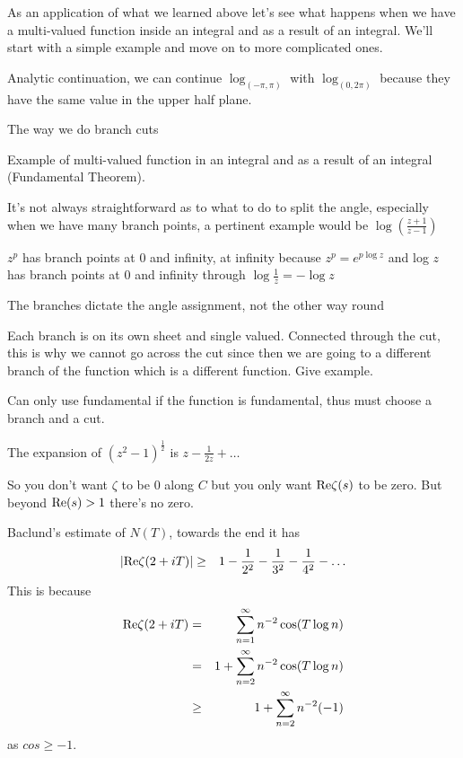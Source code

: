 \documentclass[aps,preprint,preprintnumbers,nofootinbib,showpacs,prd]{revtex4-1}
\newcommand{\nbea}{\begin{eqnarray*}}
\newcommand{\neea}{\end{eqnarray*}}
\newcommand{\re}{{\rm Re}}
\begin{document}
 


As an application of what we learned above let's see what happens when we have a multi-valued function inside an integral and as a result of an integral. We'll start with a simple example and move on to more complicated ones.





Analytic continuation, we can continue $\log_{(-\pi,\pi)}$ with $\log_{(0,2\pi)}$ because they have the same value in the upper half plane.






The way we do branch cuts



Example of multi-valued function in an integral and as a result of an integral (Fundamental Theorem).

It's not always straightforward as to what to do to split the angle, especially when we have many branch points, a pertinent example would be $\log\left ( \tfrac{z+1}{z-1}\right )$













$z^p$ has branch points at 0 and infinity, at infinity because $z^p = e^{p \log z}$ and log $z$ has branch points at 0 and infinity through $\log \tfrac{1}{z} = -\log z$



The branches dictate the angle assignment, not the other way round

Each branch is on its own sheet and single valued. Connected through the cut, this is why we cannot go across the cut since then we are going to a different branch of the function which is a different function. Give example.

Can only use fundamental if the function is fundamental, thus must choose a branch and a cut.

The expansion of $(z^2 - 1)^{\tfrac{1}{2}}$ is $z - \frac{1}{2z} + \dots$










So you don't want $\zeta$ to be 0 along $C$ but you only want $\re \zeta(s)$ to be zero. But beyond $\re(s) > 1$ there's no zero.




Baclund's estimate of $N(T)$, towards the end it has
%
\nbea
\left | \re\zeta(2 + iT)\right | & \ge & 1 - \frac{1}{2^2} - \frac{1}{3^2}- \frac{1}{4^2} - \dots
\neea
%
This is because
%
\nbea
\re\zeta(2 + iT) & = & \sum_{n=1}^\infty n^{-2} \cos(T\log n) \\
& = & 1 + \sum_{n=2}^\infty n^{-2} \cos(T\log n) \\
& \ge & 1 + \sum_{n=2}^\infty n^{-2} (-1)
\neea
%
as $cos \ge -1$.
\end{document}
